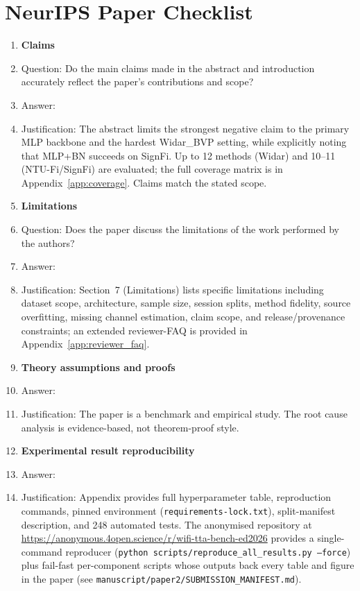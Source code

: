 \section*{NeurIPS Paper Checklist}

\begin{enumerate}

\item {\bf Claims}
    \item[] Question: Do the main claims made in the abstract and introduction accurately reflect the paper's contributions and scope?
    \item[] Answer: \answerYes{}
    \item[] Justification: The abstract limits the strongest negative claim to the primary MLP backbone and the hardest Widar\_BVP setting, while explicitly noting that MLP+BN succeeds on SignFi. Up to 12 methods (Widar) and 10--11 (NTU-Fi/SignFi) are evaluated; the full coverage matrix is in Appendix~\ref{app:coverage}. Claims match the stated scope.

\item {\bf Limitations}
    \item[] Question: Does the paper discuss the limitations of the work performed by the authors?
    \item[] Answer: \answerYes{}
    \item[] Justification: Section~7 (Limitations) lists specific limitations including dataset scope, architecture, sample size, session splits, method fidelity, source overfitting, missing channel estimation, claim scope, and release/provenance constraints; an extended reviewer-FAQ is provided in Appendix~\ref{app:reviewer_faq}.

\item {\bf Theory assumptions and proofs}
    \item[] Answer: \answerNA{}
    \item[] Justification: The paper is a benchmark and empirical study. The root cause analysis is evidence-based, not theorem-proof style.

\item {\bf Experimental result reproducibility}
    \item[] Answer: \answerYes{}
    \item[] Justification: Appendix provides full hyperparameter table, reproduction commands, pinned environment (\texttt{requirements-lock.txt}), split-manifest description, and 248 automated tests. The anonymised repository at \url{https://anonymous.4open.science/r/wifi-tta-bench-ed2026} provides a single-command reproducer (\texttt{python scripts/reproduce\_all\_results.py --force}) plus fail-fast per-component scripts whose outputs back every table and figure in the paper (see \texttt{manuscript/paper2/SUBMISSION\_MANIFEST.md}).


\end{enumerate}
